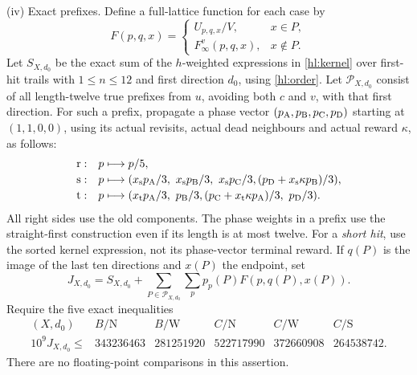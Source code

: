 \begin{definition}[H3-line]
\smallskip\noindent
\textup{(iv) Exact prefixes.}
Define a full-lattice function for each case by
\begin{equation}\label{hl:Fpatch}
 F(p,q,x)=\begin{cases}U_{p,q,x}/V,&x\in P,\\F^v_\infty(p,q,x),&x\notin P.\end{cases}
\end{equation}
Let $S_{X,d_0}$ be the exact sum of the $h$-weighted expressions
in \eqref{hl:kernel} over first-hit trails with $1\le n\le12$
and first direction $d_0$, using \eqref{hl:order}.
Let $\mathcal P_{X,d_0}$ consist of all length-twelve true prefixes
from $u$, avoiding both $c$ and $v$, with that first direction.
For such a prefix, propagate a phase vector $(p_{\rm A},p_{\rm B},p_{\rm C},p_{\rm D})$
starting at $(1,1,0,0)$, using its actual revisits, actual dead
neighbours and actual reward $\kappa$, as follows:
\begin{equation}\label{hl:phaseupdate}
\begin{array}{ll}
 \mathrm r:&p\longmapsto p/5,\\[2pt]
 \mathrm s:&p\longmapsto
 (x_{\rm s}p_{\rm A}/3,\ x_{\rm s}p_{\rm B}/3,\ x_{\rm s}p_{\rm C}/3,
             (p_{\rm D}+x_{\rm s}\kappa p_{\rm B})/3),\\[2pt]
 \mathrm t:&p\longmapsto
 (x_{\rm t}p_{\rm A}/3,\ p_{\rm B}/3,
             (p_{\rm C}+x_{\rm t}\kappa p_{\rm A})/3,\ p_{\rm D}/3).
\end{array}
\end{equation}
All right sides use the old components.  The phase weights in a
prefix use the straight-first construction even if its length is
at most twelve.  For a \emph{short hit}, use the sorted kernel
expression, not its phase-vector terminal reward.  If $q(P)$ is
the image of the last ten directions and $x(P)$ the endpoint, set
\begin{equation}\label{hl:J}
 J_{X,d_0}=S_{X,d_0}+\sum_{P\in\mathcal P_{X,d_0}}\sum_p
                    p_p(P)F(p,q(P),x(P)).
\end{equation}
Require the five exact inequalities
\begin{equation}\label{hl:prefixceil}
\begin{array}{c|rrrrr}
 (X,d_0)&B/\mathrm N&B/\mathrm W&C/\mathrm N&C/\mathrm W&C/\mathrm S\\\hline
 10^9 J_{X,d_0}\le&343236463&281251920&522717990&372660908&264538742.
\end{array}
\end{equation}
There are no floating-point comparisons in this assertion.
\end{definition}


